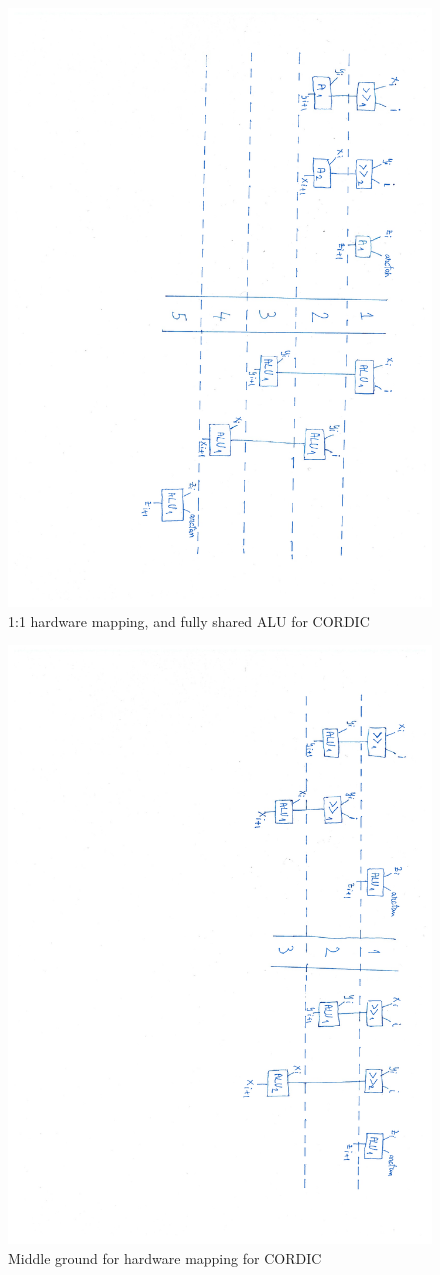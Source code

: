 \documentclass[12pt, a4paper,oneside]{article}
\begin{document}
\begin{figure}[H]
	\centering
	\includegraphics[height = \textwidth,angle=91, trim=7cm 5cm 1.5cm 5cm]{schedules.pdf}
	\caption{1:1 hardware mapping, and fully shared ALU for CORDIC}
	\label{fig:schedules}
\end{figure}
	

\begin{figure}[H]
	\centering
	\includegraphics[height = \textwidth,angle=91, trim=7cm 5cm 1.5cm 5cm]{schedules_1.pdf}
	\caption{Middle ground for hardware mapping for CORDIC}
	\label{fig:schedules_1}
\end{figure}
\end{document}
